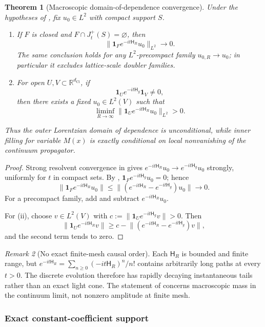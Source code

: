 \documentclass[11pt]{article}
\newtheorem{theorem}{Theorem}[section]
\theoremstyle{definition}
\theoremstyle{remark}
\newtheorem{remark}[theorem]{Remark}
\newcommand{\R}{\mathbb{R}}
\newcommand{\dCl}{d_{\mathrm{Cl}}}
\newcommand{\one}{\mathbf{1}}
\newcommand{\Ham}{\mathsf{H}}
\newcommand{\norm}[1]{\lVert#1\rVert}
\begin{document}
\begin{theorem}[Macroscopic domain-of-dependence convergence]
\label{thm:macroscopic-domain}
Under the hypotheses of , fix
\(u_0\in L^2\) with compact support \(S\).
\begin{enumerate}[label=\textup{(\roman*)},leftmargin=2.4em]
\item If \(F\) is closed and \(F\cap J_t^+(S)=\varnothing\), then
\[
 \norm{\one_F e^{-it\Ham_R}u_0}_{L^2}\longrightarrow0.
\]
The same conclusion holds for any \(L^2\)-precompact family
\(u_{0,R}\to u_0\); in particular it excludes lattice-scale doubler families.
\item For open \(U,V\subset\R^{\dCl}\), if
\[
 \one_Ue^{-it\Ham_g}\one_V\ne0,
\]
then there exists a fixed \(u_0\in L^2(V)\) such that
\[
 \liminf_{R\to\infty}
 \norm{\one_Ue^{-it\Ham_R}u_0}_{L^2}>0.
\]
\end{enumerate}
Thus the outer Lorentzian domain of dependence is unconditional, while inner
filling for variable \(M(x)\) is exactly conditional on local nonvanishing of
the continuum propagator.
\end{theorem}

\begin{proof}
Strong resolvent convergence in  gives
\(e^{-it\Ham_R}u_0\to e^{-it\Ham_g}u_0\) strongly, uniformly for \(t\) in compact
sets.  By ,
\(\one_Fe^{-it\Ham_g}u_0=0\); hence
\[
 \norm{\one_Fe^{-it\Ham_R}u_0}
 \le \norm{(e^{-it\Ham_R}-e^{-it\Ham_g})u_0}\to0.
\]
For a precompact family, add and subtract \(e^{-it\Ham_R}u_0\).

For (ii), choose \(v\in L^2(V)\) with
\(c:=\norm{\one_Ue^{-it\Ham_g}v}>0\).  Then
\[
 \norm{\one_Ue^{-it\Ham_R}v}
 \ge c-\norm{(e^{-it\Ham_R}-e^{-it\Ham_g})v},
\]
and the second term tends to zero.
\end{proof}

\begin{remark}[No exact finite-mesh causal order]
\label{rem:no-finite-mesh-order}
Each \(\Ham_R\) is bounded and finite range, but
\(e^{-it\Ham_R}=\sum_{n\ge0}(-it\Ham_R)^n/n!\) contains arbitrarily long paths
at every \(t>0\).  The discrete evolution therefore has rapidly decaying
instantaneous tails rather than an exact light cone.  The statement of
 concerns macroscopic mass in the continuum limit,
not nonzero amplitude at finite mesh.
\end{remark}

\subsubsection{Exact constant-coefficient support}
\end{document}
